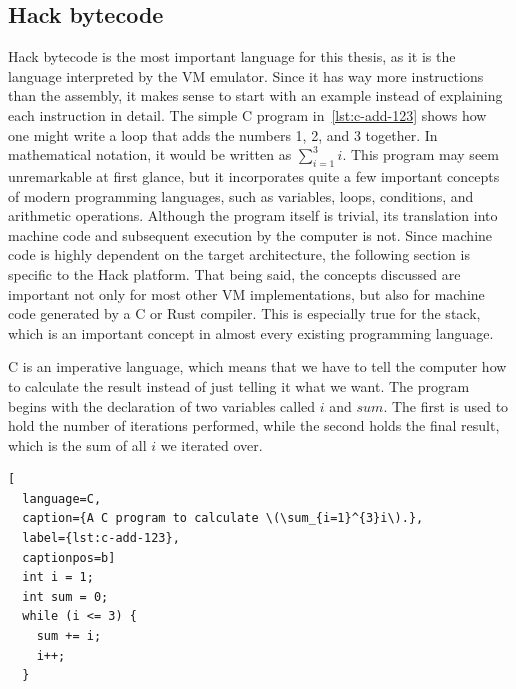 \subsection{Hack bytecode}
\label{hack-bytecode}
Hack bytecode is the most important language for this thesis, as it is the language interpreted by the VM emulator.
Since it has way more instructions than the assembly, it makes sense to start with an example instead of explaining each instruction in detail.
The simple C program in~\cref{lst:c-add-123} shows how one might write a loop that adds the numbers 1, 2, and 3 together.
In mathematical notation, it would be written as \(\sum_{i=1}^{3}i\).
This program may seem unremarkable at first glance, but it incorporates quite a few important concepts of modern programming languages, such as variables, loops, conditions, and arithmetic operations.
Although the program itself is trivial, its translation into machine code and subsequent execution by the computer is not.
Since machine code is highly dependent on the target architecture, the following section is specific to the Hack platform. That being said, the concepts discussed are important not only for most other VM implementations, but also for machine code generated by a C or Rust compiler.
This is especially true for the stack, which is an important concept in almost every existing programming language.

C is an imperative language, which means that we have to tell the computer how to calculate the result instead of just telling it what we want.
The program begins with the declaration of two variables called \(i\) and \(sum\).
The first is used to hold the number of iterations performed, while the second holds the final result, which is the sum of all \(i\) we iterated over.

\begin{lstlisting}[
  language=C,
  caption={A C program to calculate \(\sum_{i=1}^{3}i\).},
  label={lst:c-add-123},
  captionpos=b]
  int i = 1;
  int sum = 0;
  while (i <= 3) {
    sum += i;
    i++;
  }
\end{lstlisting}

